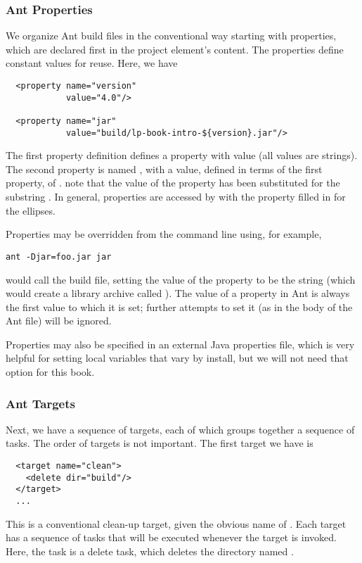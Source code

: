 \subsubsection{Ant Properties}

We organize Ant build files in the conventional way starting with
properties, which are declared first in the project element's content.
The properties define constant values for reuse.  Here, we have
%
\begin{verbatim}
  <property name="version"
            value="4.0"/>

  <property name="jar"
            value="build/lp-book-intro-${version}.jar"/>
\end{verbatim}
%
The first property definition defines a property  with
value  (all values are strings).  The second property is
named , with a value, defined in terms of the first property,
of .  note that the value of the
property  has been substituted for the substring .
In general, properties are accessed by
 with the property filled in for the ellipses.

Properties may be overridden from the command line using, for example,
%
\begin{verbatim}
ant -Djar=foo.jar jar
\end{verbatim}
%
would call the build file, setting the value of the 
property to be the string  (which would create a library
archive called ).  The value of a property in Ant is
always the first value to which it is set; further attempts to set it
(as in the body of the Ant file) will be ignored.

Properties may also be specified in an external Java properties file,
which is very helpful for setting local variables that vary by
install, but we will not need that option for this book.

\subsubsection{Ant Targets}

Next, we have a sequence of targets, each of which groups together
a sequence of tasks.  The order of targets is not important.  The
first target we have is

\begin{verbatim}
  <target name="clean">
    <delete dir="build"/>
  </target>
  ...
\end{verbatim}
%
This is a conventional clean-up target, given the obvious name of
.  Each target has a sequence of tasks that will be
executed whenever the target is invoked.  Here, the task
is a delete task, which deletes the directory named .


